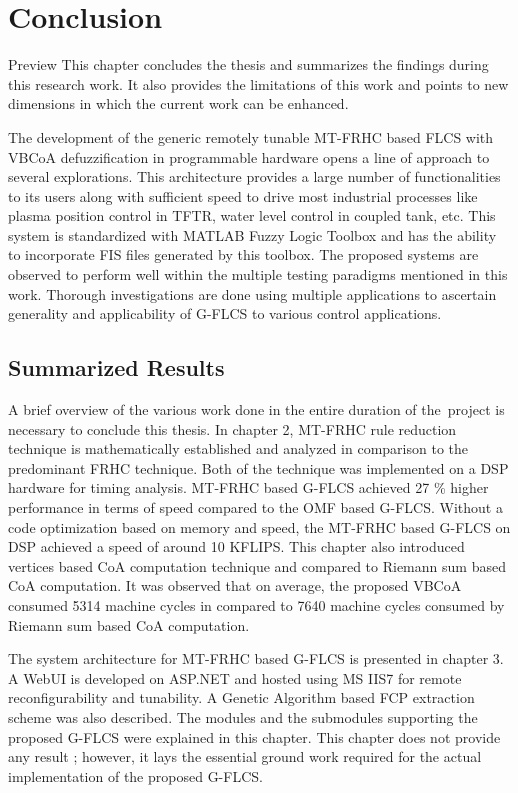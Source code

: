 \chapter{Conclusion}

\begin{chapterAbstract}{Preview}
	This chapter concludes the thesis and summarizes the findings during this research work. It also provides the limitations of this work and points to new dimensions in which the current work can be enhanced. 
\end{chapterAbstract}
\clearpage

The development of the generic remotely tunable MT-FRHC based FLCS with VBCoA defuzzification in programmable hardware opens a line of approach to several explorations. This architecture provides a large number of functionalities to its users along with sufficient speed to drive most industrial processes like plasma position control in TFTR, water level control in coupled tank, etc. This system is standardized with MATLAB Fuzzy Logic Toolbox and has the ability to incorporate FIS files generated by this toolbox. The proposed systems are observed to perform well within the multiple testing paradigms mentioned in this work. Thorough investigations are done using multiple applications to ascertain generality and applicability of G-FLCS to various control applications.

\section{Summarized Results}
A brief overview of the various work done in the entire duration of the project is necessary to conclude this thesis. In chapter 2, MT-FRHC rule reduction technique is mathematically established and analyzed in comparison to the predominant FRHC technique. Both of the technique was implemented on a DSP hardware for timing analysis. MT-FRHC based G-FLCS achieved 27 \% higher performance in terms of speed compared to the OMF based G-FLCS. Without a code optimization based on memory and speed, the MT-FRHC based G-FLCS on DSP achieved a speed of around 10 KFLIPS. This chapter also introduced vertices based CoA computation technique and compared to Riemann sum based CoA computation. It was observed that on average, the proposed VBCoA consumed 5314 machine cycles in compared to 7640 machine cycles consumed by Riemann sum based CoA computation.

The system architecture for MT\hyp{}FRHC based G\hyp{}FLCS is presented in chapter 3. A WebUI is developed on ASP.NET and hosted using MS IIS7 for remote reconfigurability and tunability. A Genetic Algorithm based FCP extraction scheme was also described. The modules and the submodules supporting the proposed G-FLCS were explained in this chapter. This chapter does not provide any result ; however, it lays the essential ground work required for the actual implementation of the proposed G-FLCS. 

